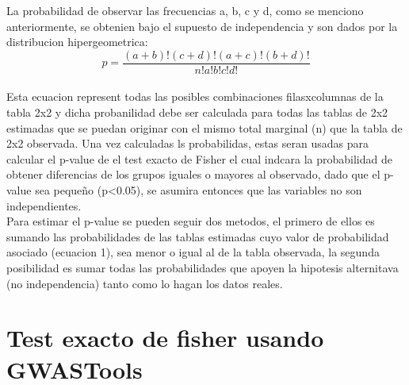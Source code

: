 \documentclass[12pt]{article}
\begin{document}
La probabilidad de observar las frecuencias a, b, c y d, como se menciono anteriormente, se obtenien bajo el supuesto de independencia y son dados por la distribucion hipergeometrica:\\

\begin{equation}
p=\frac{(a+b)!(c+d)!(a+c)!(b+d)!}{n!a!b!c!d!}
\end{equation}
\\
Esta ecuacion represent todas las posibles combinaciones filasxcolumnas de la tabla 2x2 y dicha probanilidad debe ser calculada para todas las tablas de 2x2 estimadas que se puedan originar con el mismo total marginal (n) que la tabla de 2x2 observada. Una vez calculadas ls probabilidas, estas seran usadas para calcular el p-value de el test exacto de Fisher el cual indcara la probabilidad de obtener diferencias de los grupos iguales o mayores al observado, dado que el p-value sea pequeño (p<0.05), se asumira entonces que las variables no son independientes.\\

Para estimar el p-value se pueden seguir dos metodos, el primero de ellos es sumando las probabilidades de las tablas estimadas cuyo valor de probabilidad asociado (ecuacion 1), sea menor o igual al de la tabla observada, la segunda posibilidad es sumar todas las probabilidades que apoyen la hipotesis alternitava (no independencia) tanto como lo hagan los datos reales.

\section{Test exacto de fisher usando GWASTools}
\end{document}
